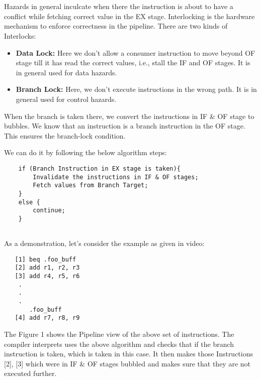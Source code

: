 \documentclass[12pt]{article}
\begin{document}
\maketitle

\section{}

Hazards in general inculcate when there the instruction is about to have a conflict while fetching correct value in the EX stage. 
Interlocking is the hardware mechanism to enforce correctness in the pipeline. There are two kinds of Interlocks: \\
\begin{itemize}
    \item \textbf{Data Lock:} Here we don’t allow a consumer instruction to move beyond OF stage till it has read the correct values, i.e., stall the IF and OF stages. It is in general used for data hazards.
    \item \textbf{Branch Lock:} Here, we don’t execute instructions in the wrong path. It is in general used for control hazards.
\end{itemize}


When the branch is taken there, we convert the instructions in IF \& OF stage to bubbles. We know that an instruction is a branch instruction in the OF stage. This ensures the branch-lock condition.

We can do it by following the below algorithm steps: \\

\begin{verbatim}
    if (Branch Instruction in EX stage is taken){
        Invalidate the instructions in IF & OF stages;
        Fetch values from Branch Target;
    }
    else {
        continue;
    }
    
\end{verbatim}

As a demonstration, let's consider the example as given in video:
\begin{verbatim}
   [1] beq .foo_buff
   [2] add r1, r2, r3
   [3] add r4, r5, r6
    .
    .
    .
       .foo_buff
   [4] add r7, r8, r9
\end{verbatim}

The Figure 1 shows the Pipeline view of the above set of instructions. The compiler interprets uses the above algorithm and checks that if the branch instruction is taken, which is taken in this case. It then makes those Instructions [2], [3] which were in IF \& OF stages bubbled and makes sure that they are not executed further. \\
\end{document}
